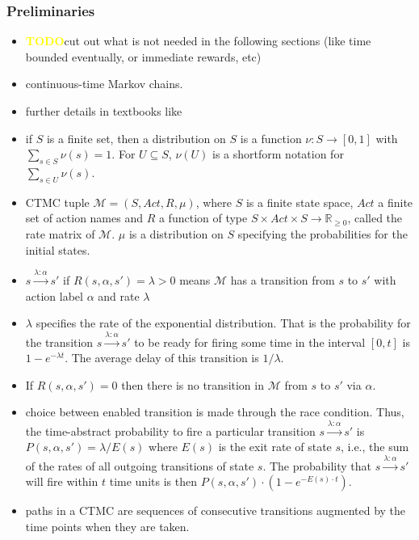 \documentclass[a4paper, 10pt]{article}
\def \todo{\textbf{\textcolor{yellow}{TODO}}}
\begin{document}
\subsubsection{Preliminaries}
\label{sssec:analysis-modelchecking-preliminaries}
\begin{itemize}
	\item \todo cut out what is not needed in the following sections (like time bounded eventually, or immediate rewards, etc)
	\item continuous-time Markov chains.
	\item further details in textbooks like \cite{kul95, ks76}
	\item if $S$ is a finite set, then a distribution on $S$ is a function $\nu:S \rightarrow [0,1]$ with $\sum\limits_{s \in S} \nu (s) = 1$. For $U \subseteq S$, $\nu (U)$ is a shortform notation for $\sum\limits_{s \in U} \nu (s)$.
	\item CTMC tuple $\mathcal{M} = (S, \mathit{Act}, R, \mu)$, where $S$ is a finite state space, $Act$ a finite set of action names and $R$ a function of type $S \times \mathit{Act} \times S \rightarrow \mathbb{R}_{\ge 0}$, called the rate matrix of $\mathcal{M}$. $\mu$ is a distribution on $S$ specifying the probabilities for the initial states.
	\item $s \xrightarrow{\lambda : \alpha} s'$ if $R(s, \alpha, s') = \lambda > 0$ means $\mathcal{M}$ has a transition from $s$ to $s'$ with action label $\alpha$ and rate $\lambda$
	\item $\lambda$ specifies the rate of the exponential distribution. That is the probability for the transition $s \xrightarrow{\lambda : \alpha} s'$ to be ready for firing some time in the interval $[0,t]$ is $1-e^{- \lambda t}$. The average delay  of this transition is $1 / \lambda$.
	\item If $R(s, \alpha, s') = 0$ then there is no transition in $\mathcal{M}$ from $s$ to $s'$ via $\alpha$.
	\item choice between enabled transition is made through the race condition. Thus, the time-abstract probability to fire a particular transition $s \xrightarrow{\lambda : \alpha} s'$ is $P(s, \alpha, s') = \lambda / E(s)$ where $E(s)$ is the exit rate of state $s$, i.e., the sum of the rates of all outgoing transitions of state $s$. The probability that $s \xrightarrow{\lambda : \alpha} s'$ will fire within $t$ time units is then $P(s, \alpha, s') \cdot (1 - e^{- E(s) \cdot t})$.
	\item paths in a CTMC are sequences of consecutive transitions augmented by the time points when they are taken.

\end{itemize}
\end{document}
